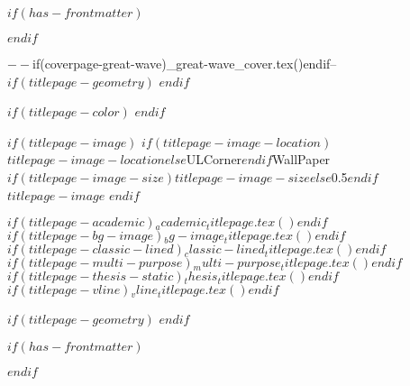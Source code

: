 $if(has-frontmatter)$
  \begin{frontmatter}
$endif$

\begin{titlepage}
$-- %
$if(coverpage-great-wave)$
$_great-wave_cover.tex()$
$endif$

$-- %
$if(titlepage-geometry)$
$endif$

$if(titlepage-color)$
\pagecolor{pgcolor}\afterpage{\nopagecolor}
$endif$

$if(titlepage-image)$
\This$if(titlepage-image-location)$$titlepage-image-location$$else$ULCorner$endif$WallPaper{$if(titlepage-image-size)$$titlepage-image-size$$else$0.5$endif$}{$titlepage-image$}
$endif$

$if(titlepage-academic)$$_academic_titlepage.tex()$$endif$
$if(titlepage-bg-image)$$_bg-image_titlepage.tex()$$endif$
$if(titlepage-classic-lined)$$_classic-lined_titlepage.tex()$$endif$
$if(titlepage-multi-purpose)$$_multi-purpose_titlepage.tex()$$endif$
$if(titlepage-thesis-static)$$_thesis_titlepage.tex()$$endif$
$if(titlepage-vline)$$_vline_titlepage.tex()$$endif$

$if(titlepage-geometry)$
\restoregeometry
$endif$

\end{titlepage}
\setcounter{page}{1}
$if(has-frontmatter)$
\end{frontmatter}
$endif$
